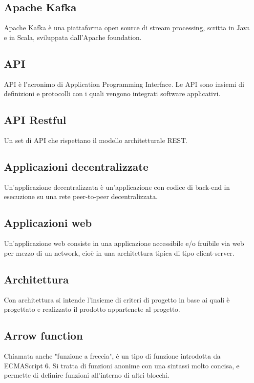 \subsection*{Apache Kafka}
Apache Kafka è una piattaforma open source di stream processing, scritta in Java e in Scala, sviluppata dall'Apache foundation.

\subsection*{API}
API è l'acronimo di Application Programming Interface. Le API sono insiemi di definizioni e protocolli con i quali vengono integrati software applicativi.

\subsection*{API Restful}
Un set di API che rispettano il modello architetturale REST.

\subsection*{Applicazioni decentralizzate}
Un'applicazione decentralizzata è un'applicazione con codice di back-end in esecuzione su una rete peer-to-peer decentralizzata.

\subsection*{Applicazioni web}
Un'applicazione web consiste in una applicazione accessibile e/o fruibile via web per mezzo di un network, cioè in una architettura tipica di tipo client-server.

\subsection*{Architettura}
Con architettura si intende l'insieme di criteri di progetto in base ai quali è progettato e realizzato il prodotto appartenete al progetto.

\subsection*{Arrow function}
Chiamata anche "funzione a freccia", è un tipo di funzione introdotta da ECMAScript 6. Si tratta di funzioni anonime con una sintassi molto concisa, e permette di definire funzioni all'interno di altri blocchi.

